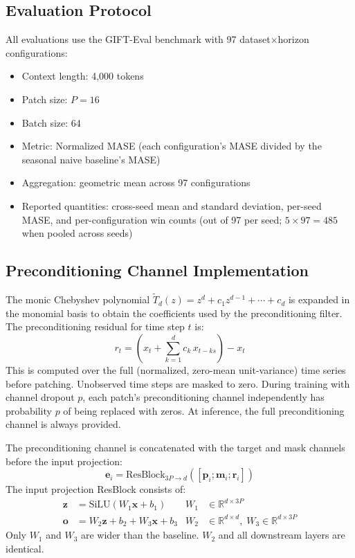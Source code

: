 \documentclass{article}
\begin{document}
\subsection{Evaluation Protocol}

All evaluations use the GIFT-Eval benchmark \citep{vijay2024gifteval} with 97 dataset$\times$horizon configurations:
\begin{itemize}
    \item Context length: 4,000 tokens 
    \item Patch size: $P = 16$ 
    \item Batch size: 64
    \item Metric: Normalized MASE (each configuration's MASE divided by the seasonal naive baseline's MASE)
    \item Aggregation: geometric mean across 97 configurations
    \item Reported quantities: cross-seed mean and standard deviation, per-seed MASE, and per-configuration win counts (out of 97 per seed; $5 \times 97 = 485$ when pooled across seeds)
\end{itemize}

\subsection{Preconditioning Channel Implementation}

The monic Chebyshev polynomial $\tilde T_d(z)=z^d+c_1 z^{d-1}+\cdots+c_d$ is expanded in the monomial basis to obtain the coefficients used by the preconditioning filter. The preconditioning residual for time step $t$ is:
\[
r_t = \left(x_t + \sum_{k=1}^{d} c_k \, x_{t-ks}\right) - x_t
\]
This is computed over the full (normalized, zero-mean unit-variance) time series before patching. Unobserved time steps are masked to zero. During training with channel dropout $p$, each patch's preconditioning channel independently has probability $p$ of being replaced with zeros. At inference, the full preconditioning channel is always provided.

The preconditioning channel is concatenated with the target and mask channels before the input projection:
\[
\mathbf{e}_i = \text{ResBlock}_{3P \to d}([\mathbf{p}_i; \mathbf{m}_i; \mathbf{r}_i])
\]
The input projection ResBlock consists of:
\begin{align}
\mathbf{z} &= \text{SiLU}(W_1 \mathbf{x} + b_1) & W_1 &\in \mathbb{R}^{d \times 3P} \\
\mathbf{o} &= W_2 \mathbf{z} + b_2 + W_3 \mathbf{x} + b_3 & W_2 &\in \mathbb{R}^{d \times d}, \; W_3 \in \mathbb{R}^{d \times 3P}
\end{align}
Only $W_1$ and $W_3$ are wider than the baseline. $W_2$ and all downstream layers are identical.
\end{document}
